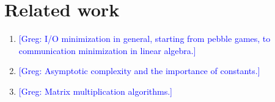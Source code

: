 \documentclass[sigplan,review,anonymous]{acmart}\settopmatter{printfolios=true,printccs=false,printacmref=false}
\newcommand\greg[1]{\textcolor{blue}{[Greg: #1]}}
\begin{document}
\section{Related work}
\begin{enumerate}
	\item \greg{I/O minimization in general, starting from pebble games, to 
	communication minimization in linear algebra.}
	\item \greg{Asymptotic complexity and the importance of constants.}
	\item \greg{Matrix multiplication algorithms.}
\end{enumerate}


%	
\end{document}
